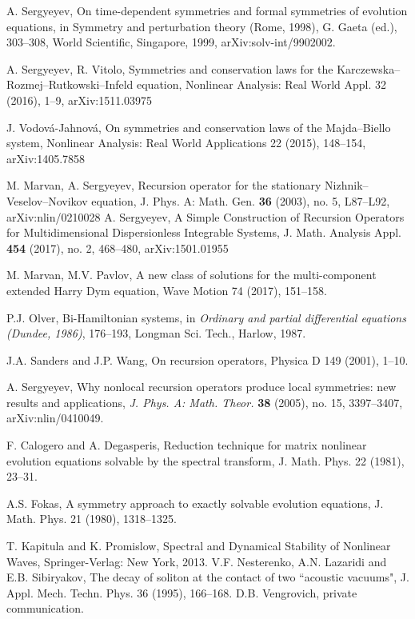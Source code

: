 \documentclass[12pt]{article}
\begin{document}
\begin{thebibliography}{99}
A. Sergyeyev,  On time-dependent symmetries and formal symmetries of evolution equations, in Symmetry and perturbation theory (Rome, 1998), G. Gaeta (ed.), 303--308, World Scientific, Singapore, 1999, arXiv:solv-int/9902002. %
    

 A. Sergyeyev, R. Vitolo, Symmetries and conservation laws for the Karczewska--Rozmej--Rut\-kowski--Infeld equation, Nonlinear Analysis: Real World Appl. 32 (2016), 1--9, arXiv:1511.03975
    

J. Vodov\'a-Jahnov\'a, On symmetries and conservation laws of the
  Majda--Bi\-el\-lo system, Nonlinear Analysis: Real World Applications 22 (2015),
  148--154, arXiv:1405.7858   
  
M. Marvan, A. Sergyeyev, Recursion operator for the stationary Nizhnik--Veselov--Novikov equation, J. Phys. A: Math. Gen. {\bf 36} (2003), no. 5, L87--L92,  arXiv:nlin/0210028
 A. Sergyeyev, A Simple Construction of Recursion Operators for Multidimensional Dispersionless Integrable Systems, J. Math. Analysis Appl. {\bf 454} (2017), no. 2, 468--480, arXiv:1501.01955
  
   

M. Marvan, M.V. Pavlov, A new class of solutions for the multi-component extended Harry Dym equation, Wave Motion 74 (2017), 151--158.

P.J. Olver, Bi-Hamiltonian systems, in {\em Ordinary and partial differential equations (Dundee, 1986)}, 176--193,
Longman Sci. Tech., Harlow, 1987.

J.A. Sanders and J.P. Wang, On recursion operators, Physica D 149 (2001), 1--10.

A. Sergyeyev, Why nonlocal recursion operators produce local symmetries: new results and applications, {\em J. Phys. A: Math. Theor.} {\bf 38} (2005), no. 15, 3397--3407,  arXiv:nlin/0410049.


F. Calogero and A. Degasperis, Reduction technique for matrix nonlinear evolution
equations solvable by the spectral transform, J. Math. Phys. 22 (1981), 23--31.



A.S. Fokas, A symmetry approach to exactly solvable evolution equations, J. Math. Phys. 21 (1980), 1318--1325.



T. Kapitula and K. Promislow, Spectral and Dynamical Stability of Nonlinear Waves,
  Springer-Verlag: New York, 2013.
 V.F. Nesterenko,  A.N. Lazaridi and E.B. Sibiryakov,  The decay of soliton at the contact of two ``acoustic vacuums",  {J. Appl. Mech. Techn. Phys.} {36}  (1995), 166--168.
D.B. Vengrovich,  private communication.



\end{thebibliography}
\end{document}
